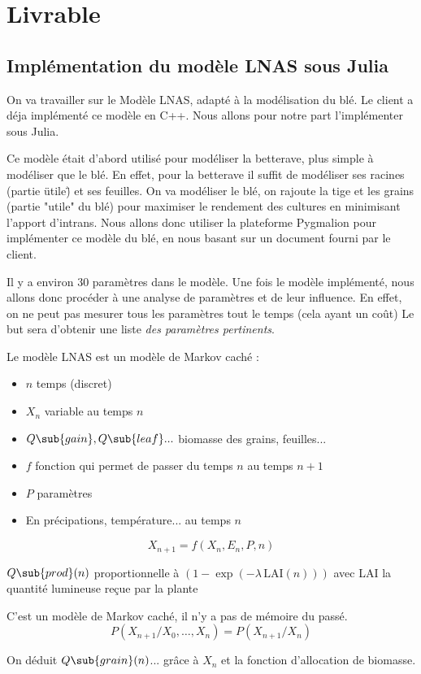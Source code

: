 \section{Livrable}
\subsection{Implémentation du modèle LNAS sous Julia}
On va travailler sur le Modèle LNAS, adapté à la modélisation du blé. 
Le client a déja implémenté ce modèle en C++. 
Nous allons pour notre part l'implémenter sous Julia.

Ce modèle était d'abord utilisé pour modéliser la betterave, 
plus simple à modéliser que le blé. 
En effet, pour la betterave il suffit de modéliser 
ses racines (partie \"utile\") et ses feuilles.
On va modéliser le blé, on rajoute la tige et les grains (partie "utile" du blé)
pour maximiser le rendement des cultures en minimisant l’apport d’intrans.
Nous allons donc utiliser la plateforme Pygmalion pour implémenter ce modèle du blé,
en nous basant sur un document fourni par le client.

Il y a environ 30 paramètres dans le modèle. Une fois le modèle implémenté, 
nous allons donc procéder à une analyse de paramètres et de leur influence. 
En effet, on ne peut pas mesurer tous les paramètres tout 
le temps (cela ayant un coût) 
Le but sera d'obtenir une liste \emph{des paramètres pertinents}.

Le modèle LNAS est un modèle de Markov caché : 
\begin{itemize}
  \item $n$  temps (discret)     
  \item $X_n$ variable au temps $n$       
  \item $Q\sub{gain}, Q\sub{leaf}... $ biomasse des grains, feuilles...      
  \item $f$ fonction qui permet de passer du temps $n$ au temps $n+1$     
  \item $P$ paramètres      
  \item En précipations, température... au temps $n$
\end{itemize}

\begin{equation}
  X_{n+1} = f(X_n,E_n,P,n)
\end{equation} 

$Q\sub{prod}(n)$ proportionnelle à $(1-\exp{(-\lambda \, \text{LAI}(n))})$ 
avec LAI la quantité lumineuse reçue par la plante

C’est un modèle de Markov caché, il n'y a pas de mémoire du passé.
\[
  P(X_{n+1}/X_0,…,X_n) = P(X_{n+1} / X_n) 
\] 

On déduit $Q\sub{grain}(n)$... grâce à $X_n$ et la fonction d'allocation de biomasse.
